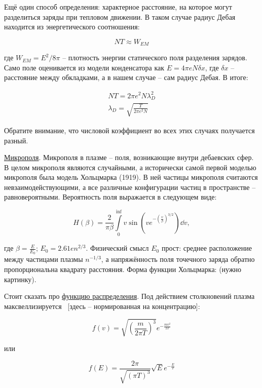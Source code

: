 \documentclass[10pt, a4paper]{article}
\begin{document}
\begin{itemize}
	Ещё один способ определения: характерное расстояние, на которое могут разделиться заряды при тепловом движении. В таком случае радиус Дебая находится из энергетического соотношения:
	
	\begin{equation*}
		NT \approx W_{EM}
	\end{equation*}

	где $W_{EM}=E^2/8\pi$ -- плотность энергии статического поля разделения зарядов. Само поле оценивается из модели конденсатора как $E=4\pi e N \delta x$, где $\delta x$ -- расстояние между обкладками, а в нашем случае -- сам радиус Дебая. В итоге:
	
	\begin{align*}
		NT = 2\pi e^2 N \lambda_D^2 \\
		\lambda_D = \sqrt{\frac{T}{2\pi e^2 N}}		
	\end{align*}

	Обратите внимание, что числовой коэффициент во всех этих случаях получается разный.
\end{itemize}

\uline{Микрополя}.
Микрополя в плазме -- поля, возникающие внутри дебаевских сфер. В целом микрополя являются случайными, а исторически самой первой моделью микрополя была модель Хольцмарка (1919). В ней частицы микрополя считаются невзаимодействующими, а все различные конфигурации частиц в пространстве -- равновероятными. Вероятность поля выражается в следующем виде:

\begin{equation*}
	H(\beta) = \frac{2}{\pi \beta} \int\limits_{0}^{\inf} v \sin(v e^{- \left(\frac{v}{\beta}\right)^{3/2}}) \dd{v},
\end{equation*}

где $\beta = \frac{E}{E_0}$; $E_0 = 2.61 e n^{2/3}$. Физический смысл $E_0$ прост: среднее расположение между частицами плазмы ${n^{-1/3}}$, а напряжённость поля точечного заряда обратно пропорциональна квадрату расстояния. Форма функции Хольцмарка:
(нужно картинку).

Стоит сказать про \uline{функцию распределения}. Под действием столкновений плазма максвеллизируется~\cite{kroll} [здесь -- нормированная на концентрацию]:

\begin{equation}
	f(v) = \sqrt{\left( \frac{m}{2\pi T}\right)^3} e^{-\frac{mv^2}{2T}}
\end{equation}

или

\begin{equation}
	f(E) = \frac{2\pi}{\sqrt{\left(\pi T\right)^3}}\sqrt{E} e^{-\frac{E}{T}}
\end{equation}
\end{document}
